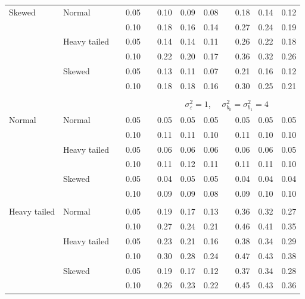 \documentclass[12pt]{article} %
\begin{document}
\begin{table}[ht]
\begin{scriptsize}
\begin{center}
\begin{tabular}{ll p{.1cm} c p{.1cm} rrr p{.1cm} rrr}
Skewed       & Normal       && 0.05 &&  0.10 & 0.09 & 0.08 && 0.18 & 0.14 & 0.12 \\ 
             &              && 0.10 &&  0.18 & 0.16 & 0.14 && 0.27 & 0.24 & 0.19 \\ 
             & Heavy tailed && 0.05 &&  0.14 & 0.14 & 0.11 && 0.26 & 0.22 & 0.18 \\ 
             &              && 0.10 &&  0.22 & 0.20 & 0.17 && 0.36 & 0.32 & 0.26 \\ 
             & Skewed       && 0.05 &&  0.13 & 0.11 & 0.07 && 0.21 & 0.16 & 0.12 \\ 
             &              && 0.10 &&  0.18 & 0.18 & 0.16 && 0.30 & 0.25 & 0.21 \\ 


&&&&&&&&&&&\\
& && && \multicolumn{7}{c}{$\sigma_{\varepsilon}^2 = 1$, \ \ $\sigma_{b_0}^2 = \sigma_{b_1}^2 = 4$} \\ \cline{6-12}
\rowcolor{gray!20}Normal       & Normal       && 0.05 &&  0.05 & 0.05 & 0.05 && 0.05 & 0.05 & 0.05 \\ 
\rowcolor{gray!20}             &              && 0.10 &&  0.11 & 0.11 & 0.10 && 0.11 & 0.10 & 0.10 \\ 
\rowcolor{gray!20}             & Heavy tailed && 0.05 &&  0.06 & 0.06 & 0.06 && 0.06 & 0.06 & 0.05 \\ 
\rowcolor{gray!20}             &              && 0.10 &&  0.11 & 0.12 & 0.11 && 0.11 & 0.11 & 0.10 \\ 
\rowcolor{gray!20}             & Skewed       && 0.05 &&  0.04 & 0.05 & 0.05 && 0.04 & 0.04 & 0.04 \\ 
\rowcolor{gray!20}             &              && 0.10 &&  0.09 & 0.09 & 0.08 && 0.09 & 0.10 & 0.10 \\ 
             &&&&&&&&&&&\\
Heavy tailed & Normal       && 0.05 &&  0.19 & 0.17 & 0.13 && 0.36 & 0.32 & 0.27 \\ 
             &              && 0.10 &&  0.27 & 0.24 & 0.21 && 0.46 & 0.41 & 0.35 \\ 
             & Heavy tailed && 0.05 &&  0.23 & 0.21 & 0.16 && 0.38 & 0.34 & 0.29 \\ 
             &              && 0.10 &&  0.30 & 0.28 & 0.24 && 0.47 & 0.43 & 0.38 \\ 
             & Skewed       && 0.05 &&  0.19 & 0.17 & 0.12 && 0.37 & 0.34 & 0.28 \\ 
             &              && 0.10 &&  0.26 & 0.23 & 0.22 && 0.45 & 0.43 & 0.36 \\ 

\end{tabular}
\end{center}
\end{scriptsize}
\end{table}
\end{document}
